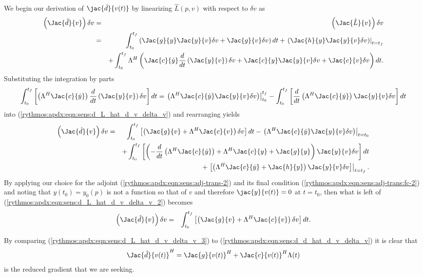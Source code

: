 We begin our derivation of $\jac{\hat{d}}{v(t)}$ by linearizing $\hat{L}(p,v)$
with respect to $\delta v$ as
%
\begin{eqnarray}
\left( \Jac{\hat{d}}{v} \right) \delta v
& = & \left( \Jac{\hat{L}}{v} \right) \delta v
\nonumber \\
& = & \int_{t_0}^{t_f} \left( \Jac{g}{y} \Jac{y}{v} \delta v +  \Jac{g}{v} \delta v \right) dt
+ \left. \left(  \Jac{h}{y} \Jac{y}{v} \delta v \right) \right|_{t=t_f}
\nonumber \\
& & + \int_{t_0}^{t_f} \Lambda^H \left( \Jac{c}{\dot{y}} \frac{d}{dt}\left( \Jac{y}{v} \right) \delta v
   + \Jac{c}{y} \Jac{y}{v} \delta v +  \Jac{c}{v} \delta v \right) dt.
\label{rythmos:apdx:eqn:sens:d_L_hat_d_v_delta_v}
\end{eqnarray}
%
Substituting the integration by parts
%
\begin{equation}
\int_{t_0}^{t_f} \left[ \left( \Lambda^H \Jac{c}{\dot{y}} \right) \frac{d}{dt}\left( \Jac{y}{v} \right) \delta v \right] dt
= \left. \left( \Lambda^H \Jac{c}{\dot{y}} \Jac{y}{v} \delta v \right) \right|_{t_0}^{t_f}
- \int_{t_0}^{t_f} \left[ \frac{d}{dt}\left( \Lambda^H \Jac{c}{\dot{y}} \right) \Jac{y}{v} \delta v \right] dt
\end{equation}
%
into (\ref{rythmos:apdx:eqn:sens:d_L_hat_d_v_delta_v}) and rearranging
yields
%
\begin{eqnarray}
\left( \Jac{\hat{d}}{v} \right) \delta v
& = & \int_{t_0}^{t_f} \left[ \left(
    \Jac{g}{v}
    + \Lambda^H \Jac{c}{v}
  \right) \delta v \right] dt
  - \left. \left( \Lambda^H \Jac{c}{\dot{y}} \Jac{y}{v} \delta v \right) \right|_{t=t_0}
\nonumber \\
& & + \int_{t_0}^{t_f} \left[ \left(
    - \frac{d}{dt}\left( \Lambda^H \Jac{c}{\dot{y}} \right)
    +  \Lambda^H \Jac{c}{y} +  \Jac{g}{y}
  \right) \Jac{y}{v} \delta v \right] dt
\nonumber \\
& & + \left. \left[ \left(
    \Lambda^H \Jac{c}{\dot{y}}
    +  \Jac{h}{y}
  \right)  \Jac{y}{v} \delta v \right] \right|_{t=t_f}
\label{rythmos:apdx:eqn:sens:d_L_hat_d_v_delta_v_2}.
\end{eqnarray}
%
By applying our choice for the adjoint
(\ref{rythmos:apdx:eqn:sens:adj-trans-2}) and its final condition
(\ref{rythmos:apdx:eqn:sens:adj-trans:fc-2}) and noting that $y(t_0) = y_0(p)$
is not a function so that of $v$ and therefore $\jac{y}{v(t)} = 0$ at $t=t_0$,
then what is left of (\ref{rythmos:apdx:eqn:sens:d_L_hat_d_v_delta_v_2})
becomes
%
\begin{eqnarray}
\left( \Jac{\hat{d}}{v} \right) \delta v
& = & \int_{t_0}^{t_f} \left[ \left(
    \Jac{g}{v}
    + \Lambda^H \Jac{c}{v}
  \right) \delta v \right] dt
\label{rythmos:apdx:eqn:sens:d_L_hat_d_v_delta_v_3}.
\end{eqnarray}

By comparing (\ref{rythmos:apdx:eqn:sens:d_L_hat_d_v_delta_v_3}) to
(\ref{rythmos:apdx:eqn:sens:d_d_hat_d_v_delta_v}) it is clear that
%
\begin{equation}
\Jac{\hat{d}}{v(t)}^H
= \Jac{g}{v(t)}^H + \Jac{c}{v(t)}^H \Lambda(t)
\label{rythmos:apdx:eqn:sens:d_d_hat_d_v_t}
\end{equation}
%
is the reduced gradient that we are seeking.
